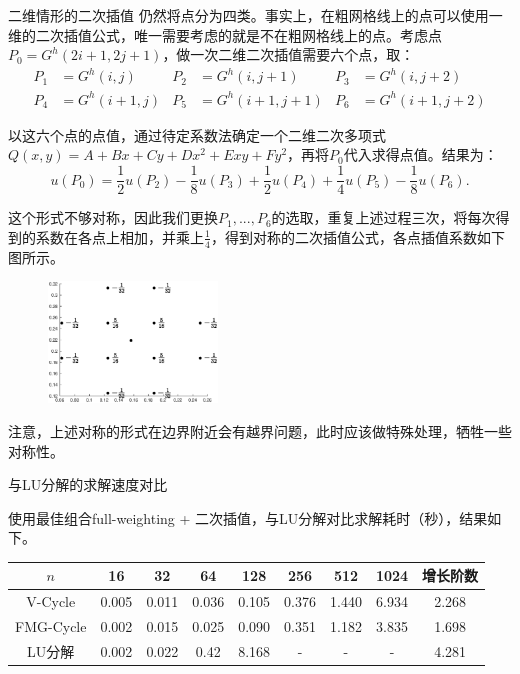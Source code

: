 \documentclass[9pt]{beamer}
\begin{document}
\begin{frame}{二维情形的二次插值}
  \small
  仍然将点分为四类。事实上，在粗网格线上的点可以使用一维的二次插值公式，唯一需要考虑的就是不在粗网格线上的点。考虑点$P_0=G^h(2i+1,2j+1)$，做一次二维二次插值需要六个点，取：
\begin{align*}
  P_1&=G^h(i,j) & P_2&=G^h(i,j+1) & P_3&=G^h(i,j+2)\\
  P_4&=G^h(i+1,j) & P_5&=G^h(i+1,j+1) & P_6&=G^h(i+1,j+2)
\end{align*}

\pause
以这六个点的点值，通过待定系数法确定一个二维二次多项式$Q(x,y)=A+Bx+Cy+Dx^2+Exy+Fy^2$，再将$P_0$代入求得点值。结果为：
\begin{equation*}
  u(P_0)=\frac{1}{2}u(P_2)-\frac{1}{8}u(P_3)+\frac{1}{2}u(P_4)+\frac{1}{4}u(P_5)-\frac{1}{8}u(P_6).
\end{equation*}

\pause
这个形式不够对称，因此我们更换$P_1,...,P_6$的选取，重复上述过程三次，将每次得到的系数在各点上相加，并乘上$\frac{1}{4}$，得到对称的二次插值公式，各点插值系数如下图所示。
\begin{figure}[H]
  \centering
  \includegraphics[width=0.4\textwidth]{../report/figure/2-1.eps}
\end{figure}

注意，上述对称的形式在边界附近会有越界问题，此时应该做特殊处理，牺牲一些对称性。
\end{frame}

\begin{frame}{与LU分解的求解速度对比}

\small
使用最佳组合full-weighting + 二次插值，与LU分解对比求解耗时（秒），结果如下。

\begin{table}[H]
  \centering
  \small
  \begin{tabular}{c|ccccccc|c}
$n$        & 16                   & 32                   & 64                   & 128                  & 256                  & 512                  & 1024                & 增长阶数 \\ \hline
V-Cycle        & 0.005 & 0.011 & 0.036 & 0.105 & 0.376 & 1.440 &  6.934 & 2.268  \\
FMG-Cycle      & 0.002 & 0.015 & 0.025 & 0.090 & 0.351 & 1.182 &  3.835 & 1.698 \\
LU分解         & 0.002 & 0.022 & 0.42 & 8.168 & - & - & - & 4.281
\end{tabular}
\end{table}

\end{frame}
\end{document}
